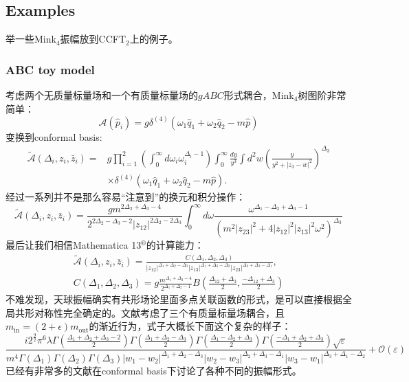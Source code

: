 \subsection{Examples}
举一些Mink$_4$振幅放到CCFT$_2$上的例子。
\subsubsection{ABC toy model}
考虑两个无质量标量场和一个有质量标量场的$gABC$形式耦合，Mink$_4$树图阶非常简单：
\begin{equation}
	\mathcal{A}(\hat{p}_i)=g\delta^{(4)}(\omega_1\hat{q}_1+\omega_2\hat{q}_2-m\hat{p})
\end{equation}
变换到conformal basis:
\begin{equation}
	\begin{aligned}
		\tilde{\mathcal{A}}(\Delta_{i},z_{i},\bar{z}_{i})=& g\prod_{i=1}^{2}\left(\int_{0}^{\infty}d\omega_{i}\omega_{i}^{\Delta_{i}-1}\right)\int_{0}^{\infty}\frac{dy}{y^{3}}\int d^{2}w\left(\frac{y}{y^{2}+|z_{3}-w|^{2}}\right)^{\Delta_{3}}  \\
		&\times\delta^{(4)}(\omega_{1}\hat{q}_{1}+\omega_{2}\hat{q}_{2}-m\hat{p}).
	\end{aligned}
\end{equation}
经过一系列并不是那么容易“注意到”的换元和积分操作\cite{Raclariu:2021zjz,Lam:2017ofc}：
\begin{equation}
	\widetilde{\mathcal{A}}(\Delta_i,z_i,\bar{z}_i)=\frac{gm^{2\Delta_2+\Delta_3-4}}{2^{2\Delta_2-\Delta_3-2}|z_{12}|^{2\Delta_2-2\Delta_3}}\int_0^\infty d\omega\frac{\omega^{\Delta_1-\Delta_2+\Delta_3-1}}{(m^2|z_{23}|^2+4|z_{12}|^2|z_{13}|^2\omega^2)^{\Delta_3}}
\end{equation}
最后让我们相信Mathematica 13$^\circledR$的计算能力：
\begin{equation}
	\begin{gathered}
		\widetilde{\mathcal{A}}(\Delta_i,z_i,\bar{z}_i) =\frac{C(\Delta_1,\Delta_2,\Delta_3)}{|z_{12}|^{\Delta_1+\Delta_2-\Delta_3}|z_{13}|^{\Delta_1+\Delta_3-\Delta_2}|z_{23}|^{\Delta_2+\Delta_3-\Delta_1}}, \\
		C(\Delta_{1},\Delta_{2},\Delta_{3}) =g\frac{m^{\Delta_1+\Delta_2-4}}{2^{\Delta_1+\Delta_2-1}}B\left(\frac{\Delta_{12}+\Delta_3}2,\frac{-\Delta_{12}+\Delta_3}2\right)
	\end{gathered}
\end{equation}
不难发现，天球振幅确实有共形场论里面多点关联函数的形式，是可以直接根据全局共形对称性完全确定的。文献\cite{Pasterski:2016qvg}考虑了三个有质量标量场耦合，且$m_{\text{in}}=(2+\epsilon)m_{\text{out}}$的渐近行为，式子大概长下面这个复杂的样子：
\begin{equation}
	\frac{i2^{\frac{9}{2}}\pi^6\lambda\Gamma(\frac{\Delta_1+\Delta_2+\Delta_3-2}{2})\Gamma(\frac{\Delta_1+\Delta_2-\Delta_3}{2})\Gamma(\frac{\Delta_1-\Delta_2+\Delta_3}{2})\Gamma(\frac{-\Delta_1+\Delta_2+\Delta_3}{2})\sqrt{\varepsilon}}{m^4\Gamma(\Delta_1)\Gamma(\Delta_2)\Gamma(\Delta_3)|w_1-w_2|^{\Delta_1+\Delta_2-\Delta_3}|w_2-w_3|^{\Delta_2+\Delta_3-\Delta_1}|w_3-w_1|^{\Delta_3+\Delta_1-\Delta_2}}+\mathcal{O}(\varepsilon)
\end{equation}
已经有非常多的文献在conformal basis下讨论了各种不同的振幅形式。
